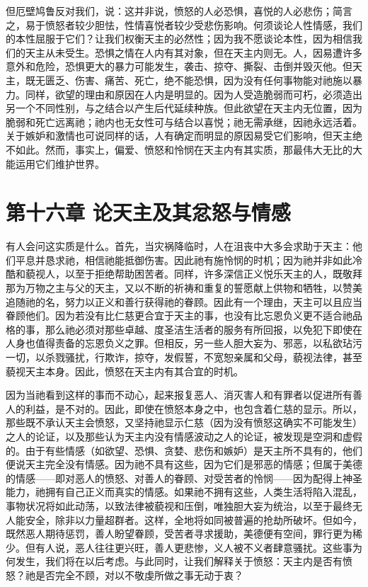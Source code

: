 但厄壁鸠鲁反对我们，说：这并非说，愤怒的人必恐惧，喜悦的人必悲伤；简言之，易于愤怒者较少胆怯，性情喜悦者较少受悲伤影响。何须谈论人性情感，我们的本性屈服于它们？让我们权衡天主的必然性；因为我不愿谈论本性，因为相信我们的天主从未受生。恐惧之情在人内有其对象，但在天主内则无。人，因易遭许多意外和危险，恐惧更大的暴力可能发生，袭击、掠夺、撕裂、击倒并毁灭他。但天主，既无匮乏、伤害、痛苦、死亡，绝不能恐惧，因为没有任何事物能对祂施以暴力。同样，欲望的理由和原因在人内是明显的。因为人受造脆弱而可朽，必须造出另一个不同性别，与之结合以产生后代延续种族。但此欲望在天主内无位置，因为脆弱和死亡远离祂；祂内也无女性可与结合以喜悦；祂无需承继，因祂永远活着。关于嫉妒和激情也可说同样的话，人有确定而明显的原因易受它们影响，但天主绝不如此。然而，事实上，偏爱、愤怒和怜悯在天主内有其实质，那最伟大无比的大能运用它们维护世界。\par


\section{第十六章 论天主及其忿怒与情感}

有人会问这实质是什么。首先，当灾祸降临时，人在沮丧中大多会求助于天主：他们平息并恳求祂，相信祂能抵御伤害。因此祂有施怜悯的时机；因为祂并非如此冷酷和藐视人，以至于拒绝帮助困苦者。同样，许多深信正义悦乐天主的人，既敬拜那为万物之主与父的天主，又以不断的祈祷和重复的誓愿献上供物和牺牲，以赞美追随祂的名，努力以正义和善行获得祂的眷顾。因此有一个理由，天主可以且应当眷顾他们。因为若没有比仁慈更合宜于天主的事，也没有比忘恩负义更不适合祂品格的事，那么祂必须对那些卓越、度圣洁生活者的服务有所回报，以免犯下即使在人身也值得责备的忘恩负义之罪。但相反，另一些人胆大妄为、邪恶，以私欲玷污一切，以杀戮骚扰，行欺诈，掠夺，发假誓，不宽恕亲属和父母，藐视法律，甚至藐视天主本身。因此，愤怒在天主内有其合宜的时机。\par

因为当祂看到这样的事而不动心，起来报复恶人、消灭害人和有罪者以促进所有善人的利益，是不对的。因此，即使在愤怒本身之中，也包含着仁慈的显示。所以，那些既不承认天主会愤怒，又坚持祂显示仁慈（因为没有愤怒这确实不可能发生）之人的论证，以及那些认为天主内没有情感波动之人的论证，被发现是空洞和虚假的。由于有些情感（如欲望、恐惧、贪婪、悲伤和嫉妒）是天主所不具有的，他们便说天主完全没有情感。因为祂不具有这些，因为它们是邪恶的情感；但属于美德的情感——即对恶人的愤怒、对善人的眷顾、对受苦者的怜悯——因为配得上神圣能力，祂拥有自己正义而真实的情感。如果祂不拥有这些，人类生活将陷入混乱，事物状况将如此动荡，以致法律被藐视和压倒，唯独胆大妄为统治，以至于最终无人能安全，除非以力量超群者。这样，全地将如同被普遍的抢劫所破坏。但如今，既然恶人期待惩罚，善人盼望眷顾，受苦者寻求援助，美德便有空间，罪行更为稀少。但有人说，恶人往往更兴旺，善人更悲惨，义人被不义者肆意骚扰。这些事为何发生，我们将在以后考虑。与此同时，让我们解释关于愤怒：天主内是否有愤怒？祂是否完全不顾，对以不敬虔所做之事无动于衷？\par

